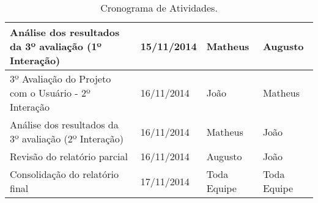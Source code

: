 \begin{table}[h]
\begin{tabular}{|p{6.5cm}|p{2.5cm}|p{2.5cm}|p{2.5cm}|}
				Análise dos resultados da 3º avaliação (1º Interação) & 15/11/2014 & Matheus & Augusto \\ \hline

				3º Avaliação do Projeto com o Usuário - 2º Interação & 16/11/2014 & João & Matheus \\ \hline

				Análise dos resultados da 3º avaliação (2º Interação) & 16/11/2014 & Matheus & João \\ \hline

				Revisão do relatório parcial & 16/11/2014 & Augusto & João \\ \hline

				Consolidação do relatório final & 17/11/2014 & Toda Equipe & Toda Equipe \\ \hline

			\end{tabular}
			\caption[Cronograma de Atividades]{Cronograma de Atividades.}
			\label{tab:versionamento_tabl}
		\end{table}
